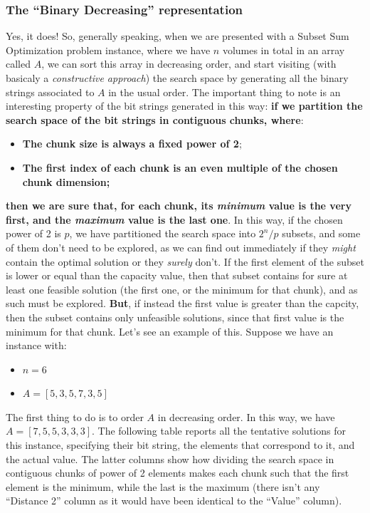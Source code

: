 \documentclass[12pt]{extarticle}
\begin{document}
\subsubsection{The ``Binary Decreasing'' representation}
Yes, it does! So, generally speaking, when we are presented with a Subset Sum Optimization problem instance, where we have $n$ volumes in total in an array called $A$, we can sort this array in decreasing order, and start visiting (with basicaly a \emph{constructive approach}) the search space by generating all the binary strings associated to $A$ in the usual order.\newline
The important thing to note is an interesting property of the bit strings generated in this way: \textbf{if we partition the search space of the bit strings in contiguous chunks, where}:
\begin{itemize}
    \item \textbf{The chunk size is always a fixed power of 2};
    \item \textbf{The first index of each chunk is an even multiple of the chosen chunk dimension;}
\end{itemize}
\textbf{then we are sure that, for each chunk, its \emph{minimum} value is the very first, and the \emph{maximum} value is the last one}. In this way, if the chosen power of 2 is $p$, we have partitioned the search space into $2^{n} / p$ subsets, and some of them don't need to be explored, as we can find out immediately if they \emph{might} contain the optimal solution or they \emph{surely} don't. If the first element of the subset is lower or equal than the capacity value, then that subset contains for sure at least one feasible solution (the first one, or the minimum for that chunk), and as such must be explored. \textbf{But}, if instead the first value is greater than the capcity, then the subset contains only unfeasible solutions, since that first value is the minimum for that chunk.
\newline
Let's see an example of this. Suppose we have an instance with:
\begin{itemize}
    \item $n = 6$
    \item $A = [5, 3, 5, 7, 3, 5]$
\end{itemize}
The first thing to do is to order $A$ in decreasing order. In this way, we have $A = [7, 5, 5, 3, 3, 3]$. The following table reports all the tentative solutions for this instance, specifying their bit string, the elements that correspond to it, and the actual value. The latter columns show how dividing the search space in contiguous chunks of power of 2 elements makes each chunk such that the first element is the minimum, while the last is the maximum (there isn't any ``Distance 2'' column as it would have been identical to the ``Value'' column).
\end{document}
